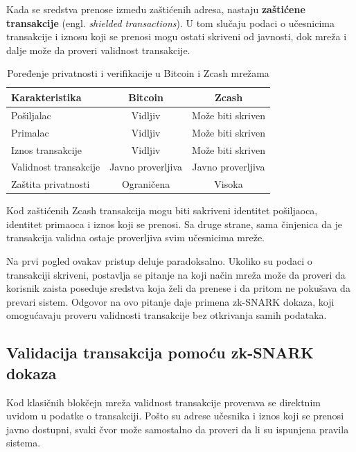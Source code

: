 Kada se sredstva prenose između zaštićenih adresa, nastaju \textbf{zaštićene transakcije} (engl. \textit{shielded transactions}). U tom slučaju podaci o učesnicima transakcije i iznosu koji se prenosi mogu ostati skriveni od javnosti, dok mreža i dalje može da proveri validnost transakcije.

\begin{table}[H]
    \centering
    \begin{tabular}{|l|c|c|}
    \hline
    \textbf{Karakteristika} & \textbf{Bitcoin} & \textbf{Zcash} \\
    \hline
    Pošiljalac & Vidljiv & Može biti skriven \\
    \hline
    Primalac & Vidljiv & Može biti skriven \\
    \hline
    Iznos transakcije & Vidljiv & Može biti skriven \\
    \hline
    Validnost transakcije & Javno proverljiva & Javno proverljiva \\
    \hline
    Zaštita privatnosti & Ograničena & Visoka \\
    \hline
    \end{tabular}
    \caption{Poređenje privatnosti i verifikacije u Bitcoin i Zcash mrežama}
    \label{tab:bitcoin-zcash}
\end{table}

Kod zaštićenih Zcash transakcija mogu biti sakriveni identitet pošiljaoca, identitet primaoca i iznos koji se prenosi. Sa druge strane, sama činjenica da je transakcija validna ostaje proverljiva svim učesnicima mreže.

Na prvi pogled ovakav pristup deluje paradoksalno. Ukoliko su podaci o transakciji skriveni, postavlja se pitanje na koji način mreža može da proveri da korisnik zaista poseduje sredstva koja želi da prenese i da pritom ne pokušava da prevari sistem. Odgovor na ovo pitanje daje primena zk-SNARK dokaza, koji omogućavaju proveru validnosti transakcije bez otkrivanja samih podataka.

\subsection{Validacija transakcija pomoću zk-SNARK dokaza}

Kod klasičnih blokčejn mreža validnost transakcije proverava se direktnim uvidom u podatke o transakciji. Pošto su adrese učesnika i iznos koji se prenosi javno dostupni, svaki čvor može samostalno da proveri da li su ispunjena pravila sistema.

